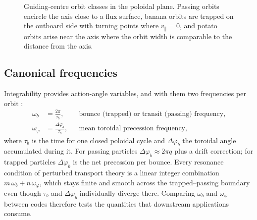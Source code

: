 \documentclass[11pt,a4paper]{article}
\begin{document}
\begin{figure}[htb]
\centering
{}
\caption{Guiding-centre orbit classes in the poloidal plane. Passing orbits
encircle the axis close to a flux surface, banana orbits are trapped on the
outboard side with turning points where $v_\parallel = 0$, and potato orbits
arise near the axis where the orbit width is comparable to the distance from
the axis.}
\label{fig:orbits}
\end{figure}

\subsection{Canonical frequencies}
\label{sec:frequencies}

Integrability provides action-angle variables, and with them two frequencies
per orbit \citep{albert2016}:
\begin{align}
  \omega_b &= \frac{2\pi}{\tau_b},
  &&\text{bounce (trapped) or transit (passing) frequency,} \\
  \omega_\varphi &= \frac{\Delta\varphi_b}{\tau_b},
  &&\text{mean toroidal precession frequency,}
\end{align}
where $\tau_b$ is the time for one closed poloidal cycle and
$\Delta\varphi_b$ the toroidal angle accumulated during it. For passing
particles $\Delta\varphi_b \approx 2\pi q$ plus a drift correction; for
trapped particles $\Delta\varphi_b$ is the net precession per bounce. Every
resonance condition of perturbed transport theory is a linear
integer combination $m\,\omega_b + n\,\omega_\varphi$, which stays finite and
smooth across the trapped--passing boundary even though $\tau_b$ and
$\Delta\varphi_b$ individually diverge there. Comparing $\omega_b$ and
$\omega_\varphi$ between codes therefore tests the quantities that
downstream applications consume.
\end{document}

